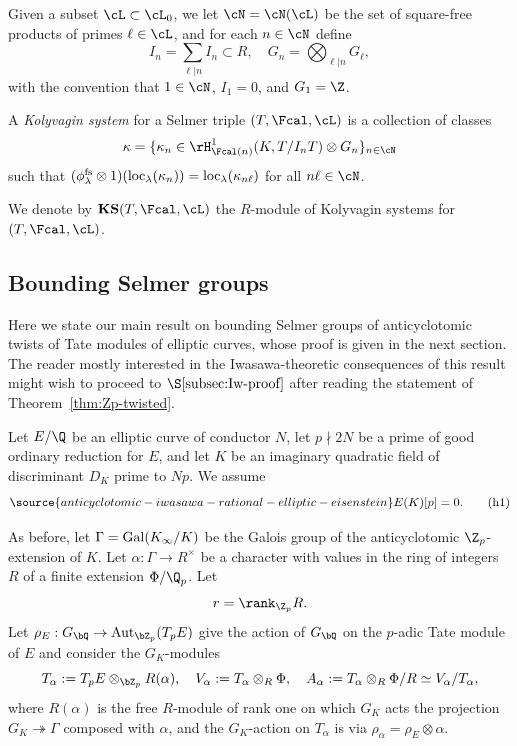 Given a subset $\cL\subset\cL_0$, we let $\cN=\cN(\cL)$ be the set of square-free products of primes $\ell\in\cL$, and for each $n\in\cN$ define
\[
I_n=\sum_{\ell\vert n}I_n\subset R,\quad G_n=\bigotimes_{\ell\vert n}G_\ell,
\]
with the convention that $1\in\cN$, $I_1=0$, and $G_1=\Z$.

\begin{definition}
\notready
A \emph{Kolyvagin system} for a Selmer triple $(T,\Fcal,\cL)$ is a collection of classes
\[
\kappa=\{\kappa_n\in\rH^1_{\Fcal(n)}(K,T/I_nT)\otimes G_n\}_{n\in\cN}
\]
such that
$(\phi_\lambda^{\rm fs}\otimes 1)({\rm loc}_\lambda(\kappa_n))={\rm loc}_\lambda(\kappa_{n\ell})$ for all $n\ell\in\cN$.
\end{definition}

We denote by $\mathbf{KS}(T,\Fcal,\cL)$ the $R$-module of Kolyvagin systems for $(T,\Fcal,\cL)$.


\subsection{Bounding Selmer groups}\label{sec:Zp-twisted}

Here we state our main result on bounding Selmer groups of anticyclotomic twists of Tate modules of elliptic curves, whose proof is given in the next section. The reader mostly interested in the Iwasawa-theoretic consequences of this result might wish to proceed to $\S\ref{subsec:Iw-proof}$ after reading the statement of Theorem~\ref{thm:Zp-twisted}.

Let $E/\Q$ be an elliptic curve of conductor $N$, let $p\nmid 2N$ be a prime of good ordinary reduction for $E$, and let $K$ be an imaginary quadratic field of discriminant $D_K$  prime to $Np$. We assume
\begin{equation}\label{eq:h1}
\source{anticyclotomic-iwasawa-rational-elliptic-eisenstein}
E(K)[p]=0.\tag{h1}
\end{equation}

As  before, let $\Gamma={\rm Gal}(K_\infty/K)$ be the Galois group of the anticyclotomic $\Z_p$-extension of $K$.
Let $\alpha:\Gamma\rightarrow R^\times$ be a character with values in the ring of integers $R$ of a finite extension $\Phi/\Q_p$. Let
\[
r=\rank_{\Z_p}R.
\]
Let $\rho_E:G_{\bQ}\rightarrow{\rm Aut}_{\bZ_p}(T_pE)$ give the action of $G_\bQ$ on the $p$-adic Tate module of $E$ and consider the $G_K$-modules
\begin{equation}
T_\alpha:=T_pE\otimes_{\bZ_p}R(\alpha),\quad
V_\alpha:=T_\alpha\otimes_R\Phi,\quad A_\alpha:=T_\alpha\otimes_R\Phi/R\simeq V_\alpha/T_\alpha,\nonumber
\end{equation}
where $R(\alpha)$ is the free $R$-module of rank one on which $G_K$ acts the projection $G_K\twoheadrightarrow\Gamma$ composed with $\alpha$, and the $G_K$-action on $T_\alpha$ is via $\rho_\alpha = \rho_E\otimes\alpha$.

